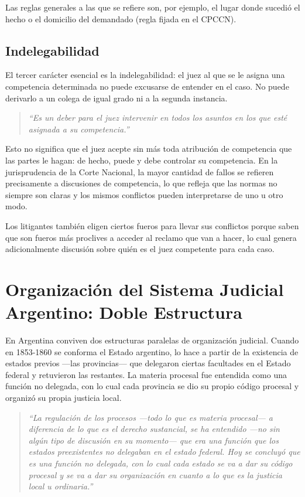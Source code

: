 \documentclass[12pt,oneside]{book}
\begin{document}
Las reglas generales a las que se refiere son, por ejemplo, el lugar donde sucedió el hecho o el domicilio del demandado (regla fijada en el CPCCN).

\subsection{Indelegabilidad}

El tercer carácter esencial es la indelegabilidad: el juez al que se le asigna una competencia determinada no puede excusarse de entender en el caso. No puede derivarlo a un colega de igual grado ni a la segunda instancia.

\begin{quote}
\itshape
``Es un deber para el juez intervenir en todos los asuntos en los que esté asignada a su competencia.''
\end{quote}

Esto no significa que el juez acepte sin más toda atribución de competencia que las partes le hagan: de hecho, puede y debe controlar su competencia. En la jurisprudencia de la Corte Nacional, la mayor cantidad de fallos se refieren precisamente a discusiones de competencia, lo que refleja que las normas no siempre son claras y los mismos conflictos pueden interpretarse de uno u otro modo.

\begin{note}
Los litigantes también eligen ciertos fueros para llevar sus conflictos porque saben que son fueros más proclives a acceder al reclamo que van a hacer, lo cual genera adicionalmente discusión sobre quién es el juez competente para cada caso.
\end{note}

\section{Organización del Sistema Judicial Argentino: Doble Estructura}

En Argentina conviven dos estructuras paralelas de organización judicial. Cuando en 1853-1860 se conforma el Estado argentino, lo hace a partir de la existencia de estados previos —las provincias— que delegaron ciertas facultades en el Estado federal y retuvieron las restantes. La materia procesal fue entendida como una función no delegada, con lo cual cada provincia se dio su propio código procesal y organizó su propia justicia local.

\begin{quote}
\itshape
``La regulación de los procesos —todo lo que es materia procesal— a diferencia de lo que es el derecho sustancial, se ha entendido —no sin algún tipo de discusión en su momento— que era una función que los estados preexistentes no delegaban en el estado federal. Hoy se concluyó que es una función no delegada, con lo cual cada estado se va a dar su código procesal y se va a dar su organización en cuanto a lo que es la justicia local u ordinaria.''
\end{quote}
\end{document}
